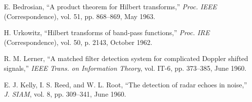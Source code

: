 \documentclass[11pt]{article}
\begin{document}
\begin{thebibliography}{9}
E. Bedrosian, ``A product theorem for Hilbert transforms,'' \emph{Proc. IEEE} (Correspondence), vol. 51, pp. 868--869, May 1963.

H. Urkowitz, ``Hilbert transforms of band-pass functions,'' \emph{Proc. IRE} (Correspondence), vol. 50, p. 2143, October 1962.

R. M. Lerner, ``A matched filter detection system for complicated Doppler shifted signals,'' \emph{IEEE Trans. on Information Theory}, vol. IT-6, pp. 373--385, June 1960.

E. J. Kelly, I. S. Reed, and W. L. Root, ``The detection of radar echoes in noise,'' \emph{J. SIAM}, vol. 8, pp. 309--341, June 1960.
\end{thebibliography}
\end{document}

